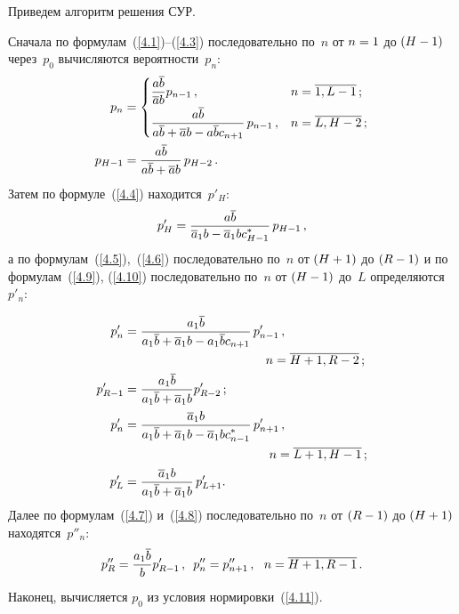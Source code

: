 \begin{multicols}{2}
Приведем алгоритм решения СУР.

Сначала по формулам~(\ref{4.1})--(\ref{4.3})
последовательно по~$n$ от $n\hm=1$ до $(H\hm-1)$
через~$p_0$ вычисляются вероятности~$p_n$:
\begin{align*}
p_{n} &= \begin{cases}
\displaystyle\frac{\displaystyle a \overline{b}\mathstrut}{\displaystyle \overline{a} b\mathstrut} p_{n-1}\,,
&  n=\overline{1,L-1}\,;
\\
 \displaystyle\frac{\displaystyle a \overline{b}\mathstrut}{\displaystyle a \overline{b} + \overline{a} b - a \overline{b} c_{n+1}\mathstrut} \,p_{n-1}\,,
&
n=\overline{L,H-2}\,;
\end{cases}\\
 p_{H-1} &= \displaystyle\frac{\displaystyle a \overline{b}\mathstrut}{\displaystyle a \overline{b} + \overline{a} b\mathstrut}\, p_{H-2}\,.
\end{align*}
Затем по формуле~(\ref{4.4}) находится~$p'_{H}$:
\begin{equation*}
p'_{H} =
\displaystyle\frac{\displaystyle  a \overline{b}\mathstrut}{\displaystyle \overline{a}_1 b - \overline{a}_1 b c^*_{H-1}\mathstrut}\, p_{H-1}\,,
\end{equation*}
а по формулам~(\ref{4.5}),~(\ref{4.6}) последовательно
по~$n$ от $(H\hm+1)$ до $(R\hm-1)$ и по формулам~(\ref{4.9}),
(\ref{4.10}) последовательно по~$n$ от $(H\hm-1)$ до~$L$ определяются~$p'_{n}$:

\noindent
\begin{align*}
p'_{n} &=
\fr{a_1 \overline{b}}{a_1 \overline{b} + \overline{a}_1 b - a_1 \overline{b} c_{n+1}}
\,p'_{n-1} \,,\\
&\hspace*{40mm}n=\overline{H+1,R-2}\,;
\\
p'_{R-1} &=
\fr{a_1 \overline{b}}{a_1 \overline{b} + \overline{a}_1 b} p'_{R-2} \,;
\\
p'_{n} &=
\fr{\overline{a}_1 b }{a_1 \overline{b} + \overline{a}_1 b -
\overline{a}_1 b c^*_{n-1}}\,p'_{n+1}\,,
\\
&\hspace*{41mm}n=\overline{L+1,H-1}\,;
\\
p'_{L} & =
\fr{\overline{a}_1 b }{a_1 \overline{b} + \overline{a}_1 b}\, p'_{L+1}.
\end{align*}
Далее по формулам~(\ref{4.7}) и~(\ref{4.8})
последовательно по~$n$ от $(R\hm-1)$ до $(H\hm+1)$ находятся~$p''_{n}$:
\begin{equation*}
p''_{R} = \displaystyle\frac{\displaystyle a_1 \overline{b} \mathstrut}{\displaystyle  b\mathstrut} p'_{R-1}\,,
\enskip
p''_{n} = p''_{n+1} \,,
\ \ n=\overline{H+1,R-1}\,.
\end{equation*}
Наконец, вычисляется $p_{0}$ из условия нормировки~(\ref{4.11}).



\end{multicols}

